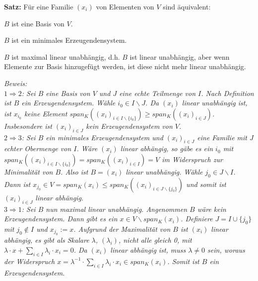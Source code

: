 \documentclass[11pt]{article}
\begin{document}
		\begin{framed}
			\textbf{Satz:} Für eine Familie $(x_i)$ von Elementen von $V$ sind äquivalent:
			\begin{compactitem}
				\item $B$ ist eine Basis von $V$.
				\item $B$ ist ein minimales Erzeugendensystem.
				\item $B$ ist maximal linear unabhängig, d.h. $B$ ist linear unabhängig, aber wenn Elemente zur Basis 
				hinzugefügt werden, ist diese nicht mehr linear unabhängig.
			\end{compactitem}
		\end{framed}
		\textit{Beweis: \\
		$1 \Rightarrow 2$: Sei $B$ eine Basis von $V$ und $J$ eine echte Teilmenge von $I$. Nach Definition ist $B$ ein 
		Erzeugendensystem. Wähle $i_0 \in I\backslash J$. Da $(x_i)$ linear unabhängig ist, ist $x_{i_0}$ keine Element 
		$span_K((x_i)_{i \in I\backslash \{i_0\}}) \ge span_K((x_i)_{i \in J})$. Insbesondere ist $(x_i)_{i\in J}$ kein 
		Erzeugendensystem von $V$. \\
		$2 \Rightarrow 3$: Sei $B$ ein minimales Erzeugendensystem und $(x_i)_{i \in J}$ eine Familie mit $J$ echter 
		Obermenge von $I$. Wäre $(x_i)$ linear abhängig, so gäbe es ein $i_0$ mit $span_K((x_i)_{i \in I\backslash 
		\{i_0\}}) = span_K((x_i)_{i \in I})=V$ im Widerspruch zur Minimalität von $B$. Also ist $B=(x_i)$ linear 
		unabhängig. Wähle $j_0 \in J\backslash I$. Dann ist $x_{j_0} \in V=span_K(x_i) \le span_K((x_i)_{i \in 
		J\backslash \{j_0\}})$ und somit ist $(x_i)_{i\in J}$ linear abhängig. \\
		$3 \Rightarrow 1$: Sei $B$ nun maximal linear unabhängig. Angenommen $B$ wäre kein Erzeugendensystem. 
		Dann gibt es ein $x\in V \backslash span_K(x_i)$. Definiere $J=I \cup \{j_0\}$ mit $j_0 \notin I$ und $x_{j_0}:=x$. 
		Aufgrund der Maximalität von $B$ ist $(x_i)$ linear abhängig, es gibt als Skalare $\lambda$, $(\lambda_i)$, nicht 
		alle gleich 0, mit $\lambda\cdot x+\sum\limits_{i \in I} \lambda_i\cdot x_i=0$. Da $(x_i)$ linear abhängig ist, 
		muss $\lambda \neq 0$ sein, woraus der Widerspruch $x=\lambda^{-1}\cdot\sum\limits_{i \in I} \lambda_i\cdot x_i 
		\in span_K(x_i)$. Somit ist $B$ ein Erzeugendensystem.} \\
		
\end{document}
